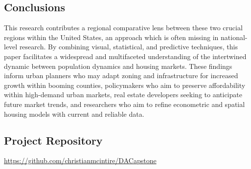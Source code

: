 \documentclass[journal,article,submit,pdftex,moreauthors]{Definitions/mdpi}
\begin{document}
\subsection{Conclusions}

This research contributes a regional comparative lens between these two crucial regions within the United States, an approach which is often missing in national-level research. By combining visual, statistical, and predictive techniques, this paper facilitates a widespread and multifaceted understanding of the intertwined dynamic between population dynamics and housing markets. These findings inform urban planners who may adapt zoning and infrastructure for increased growth within booming counties, policymakers who aim to preserve affordability within high-demand urban markets, real estate developers seeking to anticipate future market trends, and researchers who aim to refine econometric and spatial housing models with current and reliable data.

\subsection{Project Repository}
\noindent\url{https://github.com/christianmcintire/DACapstone}

\end{document}
